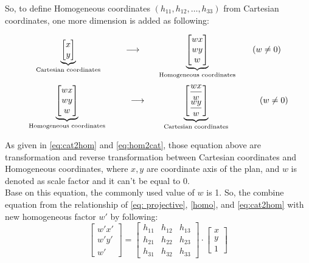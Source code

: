 \documentclass{rithy-thesis}
\begin{document}
So, to define Homogeneous coordinates $(h_{11},h_{12},\dots , h_{33})$ from Cartesian coordinates, one more dimension is added as following:

\begin{align}
&\underbrace{
  \begin{bmatrix}
    x \\
    y \\
  \end{bmatrix}
}_{\text{\scriptsize Cartesian coordinates}}
\qquad&\longrightarrow\qquad
\underbrace{
  \begin{bmatrix}
    wx \\
    wy \\
    w
  \end{bmatrix}
}_{\text{\scriptsize Homogeneous coordinates}}
\qquad (w \neq 0) \label{eq:cat2hom}
\end{align}
\begin{align}
&\underbrace{
  \begin{bmatrix}
    wx \\
    wy \\
    w
  \end{bmatrix}
}_{\text{\scriptsize Homogeneous coordinates}}
\qquad&\longrightarrow\qquad
\underbrace{
  \begin{bmatrix}
    \dfrac{wx}{w} \\[1ex]
    \dfrac{wy}{w} \\[1ex]
  \end{bmatrix}
}_{\text{\scriptsize Cartesian coordinates}}
\hspace{1.3cm} (w \neq 0) \label{eq:hom2cat}
\end{align}

As given in \eqref{eq:cat2hom} and \eqref{eq:hom2cat}, those equation above are transformation and reverse transformation between Cartesian coordinates and Homogeneous coordinates, where $x,y$ are coordinate axis of the plan, and $w$ is denoted as scale factor and it can't be equal to 0.\\

Base on this equation, the commonly used value of $w$ is 1. So, the combine equation from the relationship of \eqref{eq: projective}, \eqref{homo}, and \eqref{eq:cat2hom} with new homogeneous factor $w'$ by following:
\begin{equation}
    \begin{bmatrix}
        w'x' \\
        w'y' \\
        w'
    \end{bmatrix}
    =
    \begin{bmatrix}
    h_{11} & h_{12} & h_{13} \\
    h_{21} & h_{22} & h_{23} \\
    h_{31} & h_{32} & h_{33}
    \end{bmatrix}
    \cdot
    \begin{bmatrix}
        x \\
        y \\
        1
    \end{bmatrix}
    \label{eq:matrix homo}
\end{equation}
\end{document}
